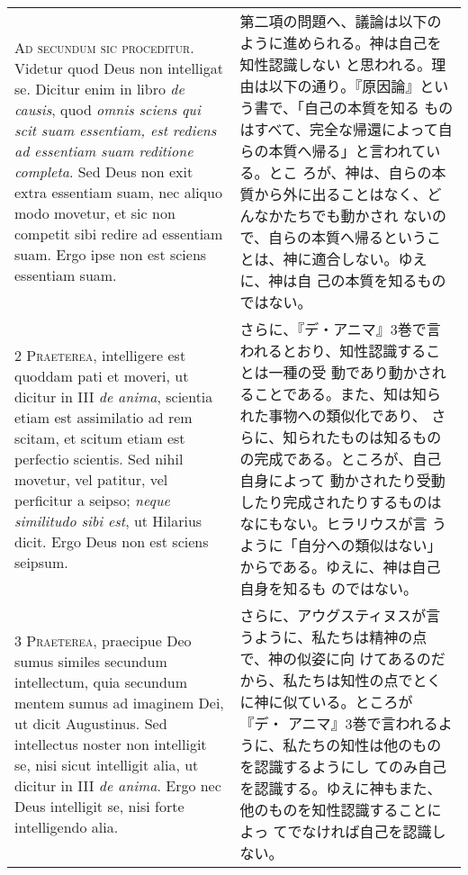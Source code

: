 \documentclass[10pt]{jsarticle} %
\begin{document}
\begin{longtable}{p{21em}p{21em}}

{\huge A}{\scshape d secundum sic proceditur}. Videtur quod Deus non
intelligat se. Dicitur enim in libro {\itshape de causis}, quod
{\itshape omnis sciens qui scit suam essentiam, est rediens ad
essentiam suam reditione completa}. Sed Deus non exit extra essentiam
suam, nec aliquo modo movetur, et sic non competit sibi redire ad
essentiam suam. Ergo ipse non est sciens essentiam suam.


&

第二項の問題へ、議論は以下のように進められる。神は自己を知性認識しない
と思われる。理由は以下の通り。『原因論』という書で、「自己の本質を知る
ものはすべて、完全な帰還によって自らの本質へ帰る」と言われている。とこ
ろが、神は、自らの本質から外に出ることはなく、どんなかたちでも動かされ
ないので、自らの本質へ帰るということは、神に適合しない。ゆえに、神は自
己の本質を知るものではない。

\\


{\scshape 2 Praeterea}, intelligere est quoddam pati et moveri, ut
dicitur in III {\itshape de anima}, scientia etiam est assimilatio ad
rem scitam, et scitum etiam est perfectio scientis. Sed nihil movetur,
vel patitur, vel perficitur a seipso; {\itshape neque similitudo sibi
est}, ut Hilarius dicit. Ergo Deus non est sciens seipsum.


&

さらに、『デ・アニマ』3巻で言われるとおり、知性認識することは一種の受
動であり動かされることである。また、知は知られた事物への類似化であり、
さらに、知られたものは知るものの完成である。ところが、自己自身によって
動かされたり受動したり完成されたりするものはなにもない。ヒラリウスが言
うように「自分への類似はない」からである。ゆえに、神は自己自身を知るも
のではない。

\\


{\scshape 3 Praeterea}, praecipue Deo sumus similes secundum
intellectum, quia secundum mentem sumus ad imaginem Dei, ut dicit
Augustinus. Sed intellectus noster non intelligit se, nisi sicut
intelligit alia, ut dicitur in III {\itshape de anima}. Ergo nec Deus
intelligit se, nisi forte intelligendo alia.


&

さらに、アウグスティヌスが言うように、私たちは精神の点で、神の似姿に向
けてあるのだから、私たちは知性の点でとくに神に似ている。ところが『デ・
アニマ』3巻で言われるように、私たちの知性は他のものを認識するようにし
てのみ自己を認識する。ゆえに神もまた、他のものを知性認識することによっ
てでなければ自己を認識しない。


\end{longtable}
\end{document}
